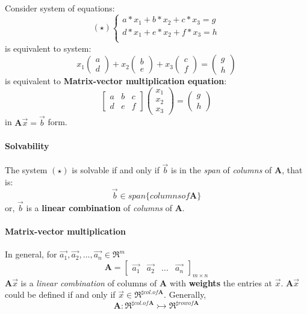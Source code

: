 \documentclass{article}
\begin{document}
	\paragraph{}Consider system of equations:
	\[
	(\star)\begin{cases}
		a*x_1 + b*x_2 + c*x_3 = g  \\
		d*x_1 + e*x_2 + f*x_3 = h \\
	\end{cases}
	\]
	is equivalent to system:
	\[
	x_1 \begin{pmatrix}a\\d\end{pmatrix} + x_2 \begin{pmatrix}b\\e\end{pmatrix} + x_3 \begin{pmatrix}c\\f\end{pmatrix} = \begin{pmatrix}g\\h\end{pmatrix}
	\]
	is equivalent to \textbf{Matrix-vector multiplication equation}:
	\[
	\begin{bmatrix}
		a&b&c\\
		d&e&f
	\end{bmatrix}
	\begin{pmatrix}
		x_1 \\ x_2 \\ x_3
	\end{pmatrix}
	=
	\begin{pmatrix}
		g\\h
	\end{pmatrix}
	\]
	in $\textbf{A} \vec{x} = \vec{b}$ form.
	\paragraph{Solvability} The system $(\star)$ is solvable if and only if $\vec{b}$ is in the \emph{span} of \emph{columns} of $\textbf{A}$, that is:
	\[
	\vec{b} \in span\{columns of \textbf{A}\}
	\]
	or, $\vec{b}$ is a \textbf{linear combination} of \emph{columns} of $\textbf{A}$.
	\paragraph{Matrix-vector multiplication} In general, for $\vec{a_1},\vec{a_2},...,\vec{a_n} \in \Re^m$
	\[
	\textbf{A} = \begin{bmatrix}\vec{a_1}&\vec{a_2}&...&\vec{a_n}\end{bmatrix}_{m \times n}
	\]
	$\textbf{A}\vec{x}$ is a \emph{linear combination} of columns of $\textbf{A}$ with \textbf{weights} the entries at $\vec{x}$.
	\newline $\textbf{A}\vec{x}$ could be defined if and only if $\vec{x} \in \Re^{\sharp col. of \textbf{A}}$.
	\newline Generally,
	\[
	\textbf{A}\colon \Re^{\sharp col. of \textbf{A}} \rightarrowtail \Re^{\sharp row of \textbf{A}}
	\]
\end{document}
